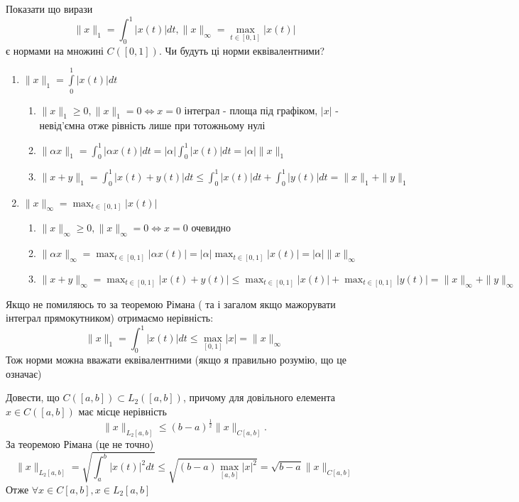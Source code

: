 \begin{tcolorbox}[title = Завдання 2]
    Показати що вирази 
    $$
    \|x\|_{1}=\int_{0}^{1}|x(t)| d t,\|x\|_{\infty}=\max _{t \in[0,1]}|x(t)|
    $$
    є нормами на множині $C([0,1])$. Чи будуть ці норми еквівалентними?
    \begin{enumerate}
        \item $\|x\|_{1}=\int\limits_{0}^{1}|x(t)| d t$
        \begin{enumerate}
            \item $\|x\|_{1} \geq 0, \|x\|_{1} = 0 \Leftrightarrow x = 0$
            інтеграл - площа під графіком, $|x|$ - невід'ємна отже рівність лише 
            при тотожньому нулі
            \item $\|\alpha x\|_{1} = \int_{0}^{1}|\alpha x(t)| dt = 
            |\alpha| \int_{0}^{1}|x(t)| dt = |\alpha| \|x\|_{1}$
            \item $\|x + y\|_{1} = \int_{0}^{1}|x(t) + y(t)| dt \leq 
            \int_{0}^{1}|x(t)| dt + \int_{0}^{1}|y(t)| dt = \|x\|_{1} + \|y\|_{1}$
        \end{enumerate}
        \item $\|x\|_{\infty}=\max _{t \in[0,1]}|x(t)|$
        \begin{enumerate}
            \item $\|x\|_{\infty} \geq 0, \|x\|_{\infty} = 0 \Leftrightarrow x = 0$ 
            очевидно 
            \item $\|\alpha x\|_{\infty} = \max_{t \in [0, 1]} |\alpha x(t)| = 
            |\alpha| \max_{t \in [0, 1]} |x(t)| = |\alpha| \|x\|_{\infty}$
            \item $\|x + y\|_{\infty} = \max_{t \in [0, 1]} |x(t) + y(t)| \leq 
            \max_{t \in [0, 1]} |x(t)| + \max_{t \in [0, 1]} |y(t)| = 
            \|x\|_{\infty} + \|y\|_{\infty}$
        \end{enumerate}
    \end{enumerate}
    Якщо не помиляюсь то за теоремою Рімана ( та і загалом якщо мажорувати 
    інтеграл прямокутником) отримаємо нерівність:
    $$ \|x\|_1 = \int_{0}^{1}|x(t)| dt \leq \max_{[0, 1]} |x|=\|x\|_{\infty}$$
    Тож норми можна вважати еквівалентними (якщо я правильно розумію, що це означає)
\end{tcolorbox}

\begin{tcolorbox}[ title = Завдання 3]
    Довести, що $C([a, b]) \subset L_{2}([a, b])$, причому для довільного елемента $x \in C([a, b])$ має місце нерівність
    $$
    \|x\|_{L_{2}[a, b]} \leq(b-a)^{\frac{1}{2}}\|x\|_{C[a, b]} .
    $$
    За теоремою Рімана (це не точно)
    $$
    \|x\|_{L_{2}[a, b]} = \sqrt{\int_{a}^{b}|x(t)|^{2} d t} \leq 
    \sqrt{(b - a)\max_{[a, b]} |x|^2} =
    \sqrt{b - a} \|x\|_{C[a, b]}
    $$
    Отже $\forall x \in C[a, b], x \in L_2[a,b]$ 

\end{tcolorbox}

